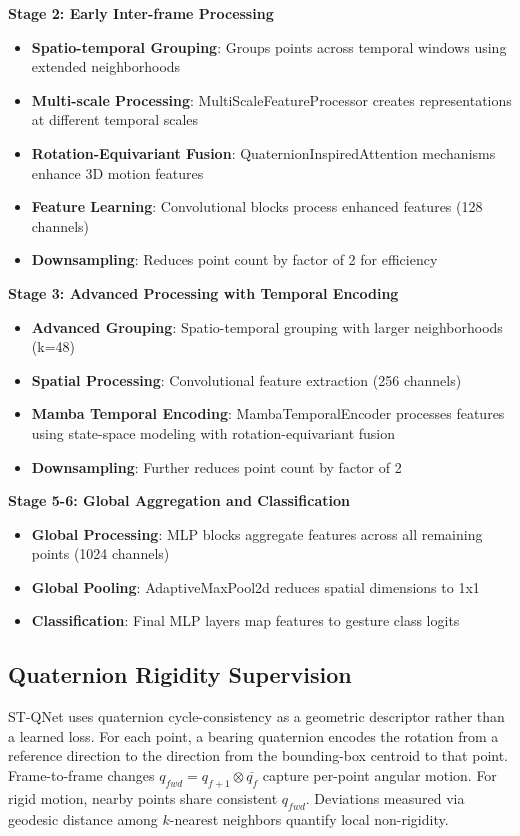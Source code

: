 \documentclass[journal]{IEEEtran}
\theoremstyle{plain}
\begin{document}
\textbf{Stage 2: Early Inter-frame Processing}
\begin{itemize}
    \item \textbf{Spatio-temporal Grouping}: Groups points across temporal windows using extended neighborhoods
    \item \textbf{Multi-scale Processing}: MultiScaleFeatureProcessor creates representations at different temporal scales
    \item \textbf{Rotation-Equivariant Fusion}: QuaternionInspiredAttention mechanisms enhance 3D motion features
    \item \textbf{Feature Learning}: Convolutional blocks process enhanced features (128 channels)
    \item \textbf{Downsampling}: Reduces point count by factor of 2 for efficiency
\end{itemize}

\textbf{Stage 3: Advanced Processing with Temporal Encoding}
\begin{itemize}
    \item \textbf{Advanced Grouping}: Spatio-temporal grouping with larger neighborhoods (k=48)
    \item \textbf{Spatial Processing}: Convolutional feature extraction (256 channels)
    \item \textbf{Mamba Temporal Encoding}: MambaTemporalEncoder processes features using state-space modeling with rotation-equivariant fusion
    \item \textbf{Downsampling}: Further reduces point count by factor of 2
\end{itemize}

\textbf{Stage 5-6: Global Aggregation and Classification}
\begin{itemize}
    \item \textbf{Global Processing}: MLP blocks aggregate features across all remaining points (1024 channels)
    \item \textbf{Global Pooling}: AdaptiveMaxPool2d reduces spatial dimensions to 1x1
    \item \textbf{Classification}: Final MLP layers map features to gesture class logits
\end{itemize}

\subsection{Quaternion Rigidity Supervision}

ST-QNet uses quaternion cycle-consistency as a geometric descriptor rather than a learned loss. For each point, a bearing quaternion encodes the rotation from a reference direction to the direction from the bounding-box centroid to that point. Frame-to-frame changes $q_{fwd} = q_{f+1} \otimes \overline{q_f}$ capture per-point angular motion. For rigid motion, nearby points share consistent $q_{fwd}$. Deviations measured via geodesic distance among $k$-nearest neighbors quantify local non-rigidity.
\end{document}

